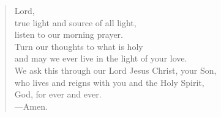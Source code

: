 \prayer

\setlength{\leftmargini}{\prayerleftmargini}

\begin{verse}
Lord,\\
true light and source of all light,\\
listen to our morning prayer.\\
Turn our thoughts to what is holy\\
and may we ever live in the light of your love.\\
We ask this through our Lord Jesus Christ, your Son,\\
who lives and reigns with you and the Holy Spirit,\\
God, for ever and ever.\\
{\color{red}---\thinspace}Amen.
\end{verse}

\setlength{\leftmargini}{\defleftmargini}